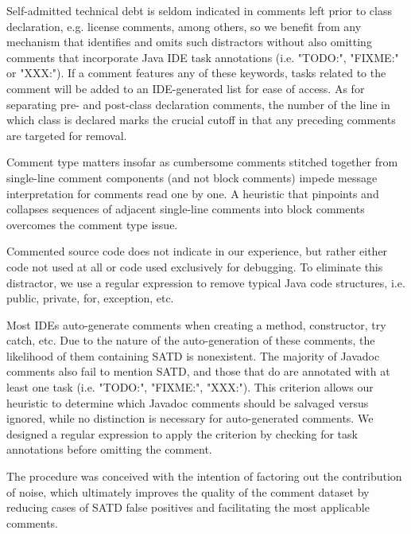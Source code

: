 Self-admitted technical debt is seldom indicated in comments left prior to class declaration, e.g. license comments, among others, so we benefit from any mechanism that identifies and omits such distractors without also omitting comments that incorporate Java IDE task annotations (i.e. "TODO:", "FIXME:" or "XXX:"). If a comment features any of these keywords, tasks related to the comment will be added to an IDE-generated list for ease of access. As for separating pre- and post-class declaration comments, the number of the line in which class is declared marks the crucial cutoff in that any preceding comments are targeted for removal.\par

Comment type matters insofar as cumbersome comments stitched together from single-line comment components (and not block comments) impede message interpretation for comments read one by one. A heuristic that pinpoints and collapses sequences of adjacent single-line comments into block comments overcomes the comment type issue.\par



Commented source code does not indicate \SATD in our experience, but rather either code not used at all or code used exclusively for debugging. To eliminate this distractor, we use a regular expression to remove typical Java code structures, i.e. public, private, for, exception, etc.\par


Most IDEs auto-generate comments when creating a method, constructor, try catch, etc. Due to the nature of the auto-generation of these comments, the likelihood of them containing SATD is nonexistent. The majority of Javadoc comments also fail to mention SATD, and those that do are annotated with at least one task (i.e. "TODO:", "FIXME:", "XXX:"). This criterion allows our heuristic to determine which Javadoc comments should be salvaged versus ignored, while no distinction is necessary for auto-generated comments. We designed a regular expression to apply the criterion by checking for task annotations before omitting the comment.\par




The procedure was conceived with the intention of factoring out the contribution of noise, which ultimately improves the quality of the comment dataset by reducing cases of SATD false positives and facilitating the most applicable comments.\par



